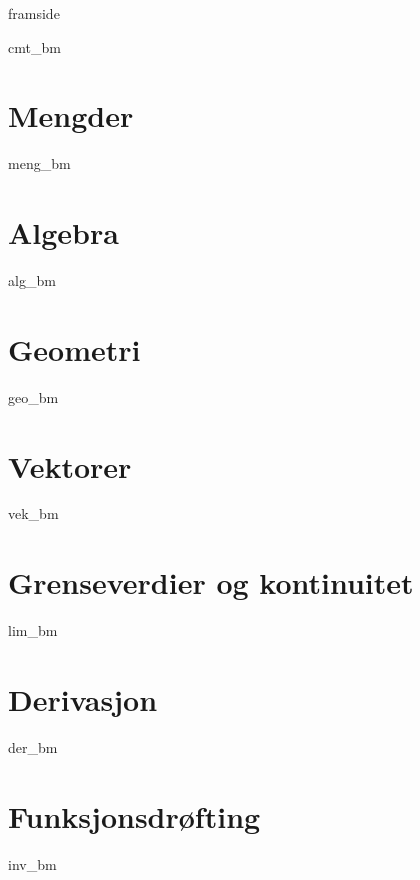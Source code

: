 





\addto\captionsenglish{\renewcommand{\contentsname}{Innhold}}


	
	{framside}
	
	{\footnotesize \tableofcontents}
	\newpage
	
	{cmt_bm}
	
	\chapter{Mengder}
	{meng_bm}
	
	\chapter{Algebra}
	{alg_bm}
	
	\chapter{Geometri}
	{geo_bm}
	
	\chapter{Vektorer}
	{vek_bm}
		
	\chapter{Grenseverdier og kontinuitet}
	{lim_bm}
	
	\chapter{Derivasjon}
	{der_bm}
	
	\chapter{Funksjonsdrøfting}
	{inv_bm}
	
	
	
	

	
